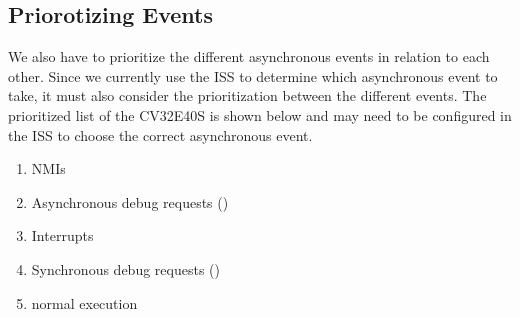 \subsection{Priorotizing Events}

We also have to prioritize the different asynchronous events in relation to each other. Since we currently use the ISS to determine which asynchronous event to take, it must also consider the prioritization between the different events. The prioritized list of the CV32E40S \cite{openhwgroupCv32e40s2024} is shown below and may need to be configured in the ISS to choose the correct asynchronous event.

\begin{enumerate}
    \item NMIs
    \item Asynchronous debug requests ()
    \item Interrupts
    \item Synchronous debug requests ()
    \item normal execution
\end{enumerate}



%
%
%
%
%
%
%
%
%
%
%
%
%


%
%

